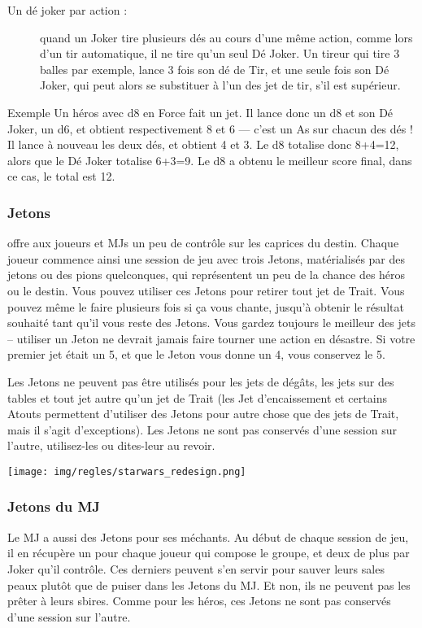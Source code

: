 \begin{description}
\item[Un dé joker par action :] quand un Joker tire plusieurs dés au cours d’une même action, comme lors d’un tir automatique, il ne tire qu’un seul Dé Joker. Un tireur qui tire 3 balles par exemple, lance 3 fois son dé de Tir, et une seule fois son Dé Joker, qui peut alors se substituer à l’un des jet de tir, s’il est supérieur.
\end{description}

\begin{commentbox}{Exemple}
Un héros avec d8 en Force fait un jet. Il lance donc un d8 et son Dé Joker, un d6, et obtient respectivement 8 et 6 — c’est un As sur chacun des dés ! Il lance à nouveau les deux dés, et obtient 4 et 3. Le d8 totalise donc 8+4=12, alors que le Dé Joker totalise 6+3=9. Le d8 a obtenu le meilleur score final, dans ce cas, le total est 12.
\end{commentbox}

\subsubsection{Jetons}
\swr offre aux joueurs et MJs un peu de contrôle sur les caprices du destin. Chaque joueur commence ainsi une session de jeu avec trois Jetons, matérialisés par des jetons ou des pions quelconques, qui représentent un peu de la chance des héros ou le destin. Vous pouvez utiliser ces Jetons pour retirer tout jet de Trait. Vous pouvez même le faire plusieurs fois si ça vous chante, jusqu’à obtenir le résultat souhaité tant qu’il vous reste des Jetons. Vous gardez toujours le meilleur des jets – utiliser un Jeton ne devrait jamais faire tourner une action en désastre. Si votre premier jet était un 5, et que le Jeton vous donne un 4, vous conservez le 5.

Les Jetons ne peuvent pas être utilisés pour les jets de dégâts, les jets sur des tables et tout jet autre qu’un jet de Trait (les Jet d’encaissement et certains Atouts permettent d’utiliser des Jetons pour autre chose que des jets de Trait, mais il s’agit d’exceptions). Les Jetons ne sont pas conservés d’une session sur l’autre, utilisez-les ou dites-leur au revoir.

\vspace*{\fill}
\hspace*{-0.5\columnsep}
\texttt{[image: img/regles/starwars\_redesign.png]}
\vspace*{\fill}

\newpage
\subsubsection{Jetons du MJ}
Le MJ a aussi des Jetons pour ses méchants. Au début de chaque session de jeu, il en récupère un pour chaque joueur qui compose le groupe, et deux de plus par Joker qu’il contrôle. Ces derniers peuvent s’en servir pour sauver leurs sales peaux plutôt que de puiser dans les Jetons du MJ. Et non, ils ne peuvent pas les prêter à leurs sbires. Comme pour les héros, ces Jetons ne sont pas conservés d’une session sur l’autre.

